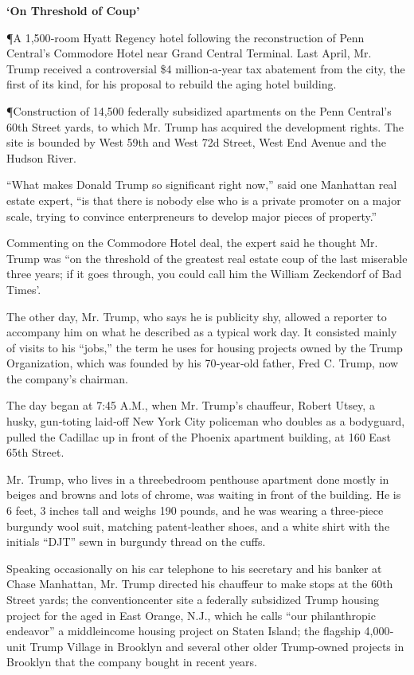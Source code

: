 \textbf{`On Threshold of Coup'}

¶A 1,500‐room Hyatt Regency hotel following the reconstruction of Penn
Central's Commodore Hotel near Grand Central Terminal. Last April, Mr.
Trump received a controversial \$4 million‐a‐year tax abatement from the
city, the first of its kind, for his proposal to rebuild the aging hotel
building.

¶Construction of 14,500 federally subsidized apartments on the Penn
Central's 60th Street yards, to which Mr. Trump has acquired the
development rights. The site is bounded by West 59th and West 72d
Street, West End Avenue and the Hudson River.

``What makes Donald Trump so significant right now,'' said one Manhattan
real estate expert, ``is that there is nobody else who is a private
promoter on a major scale, trying to convince enterpreneurs to develop
major pieces of property.''

Commenting on the Commodore Hotel deal, the expert said he thought Mr.
Trump was ``on the threshold of the greatest real estate coup of the
last miserable three years; if it goes through, you could call him the
William Zeckendorf of Bad Times'.

The other day, Mr. Trump, who says he is publicity shy, allowed a
reporter to accompany him on what he described as a typical work day. It
consisted mainly of visits to his ``jobs,'' the term he uses for housing
projects owned by the Trump Organization, which was founded by his
70‐year‐old father, Fred C. Trump, now the company's chairman.

The day began at 7:45 A.M., when Mr. Trump's chauffeur, Robert Utsey, a
husky, gun‐toting laid‐off New York City policeman who doubles as a
bodyguard, pulled the Cadillac up in front of the Phoenix apartment
building, at 160 East 65th Street.

Mr. Trump, who lives in a threebedroom penthouse apartment done mostly
in beiges and browns and lots of chrome, was waiting in front of the
building. He is 6 feet, 3 inches tall and weighs 190 pounds, and he was
wearing a three‐piece burgundy wool suit, matching patent‐leather shoes,
and a white shirt with the initials ``DJT'' sewn in burgundy thread on
the cuffs.

Speaking occasionally on his car telephone to his secretary and his
banker at Chase Manhattan, Mr. Trump directed his chauffeur to make
stops at the 60th Street yards; the conventioncenter site a federally
subsidized Trump housing project for the aged in East Orange, N.J.,
which he calls ``our philanthropic endeavor'' a middleincome housing
project on Staten Island; the flagship 4,000‐unit Trump Village in
Brooklyn and several other older Trump‐owned projects in Brooklyn that
the company bought in recent years.

